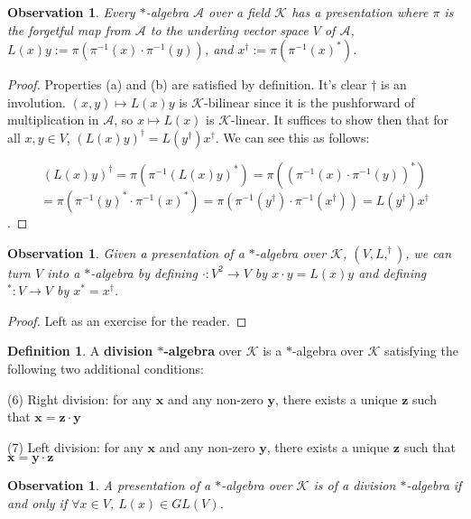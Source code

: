 \documentclass[12pt]{article}
\newtheorem{observation}[theorem]{Observation}
\theoremstyle{definition}
\newtheorem{definition}[theorem]{Definition}
\theoremstyle{remark}
\begin{document}
\begin{observation} Every \(*\)-algebra \(\mathcal{A}\) over a field \(\mathcal{K}\) has a presentation where \(\pi\) is the forgetful map from \(\mathcal{A}\) to the underling vector space \(V\) of \(\mathcal{A}\), \(L(x)y := \pi(\pi^{-1}(x) \cdot \pi^{-1}(y))\), and \(x^{\dagger} := \pi(\pi^{-1}(x)^*)\).
\end{observation}

\begin{proof}
Properties (a) and (b) are satisfied by definition. It's clear \(\dagger\) is an involution. \((x,y) \mapsto L(x)y\) is \(\mathcal{K}\)-bilinear since it is the pushforward of multiplication in \(\mathcal{A}\), so \(x \mapsto L(x)\) is \(\mathcal{K}\)-linear. It suffices to show then that for all \(x,y \in V\), $(L(x)y)^{\dagger} = L(y^{\dagger}) x^{\dagger}$. We can see this as follows:

\[(L(x)y)^{\dagger} = \pi(\pi^{-1}(L(x)y)^*) = \pi((\pi^{-1}(x) \cdot \pi^{-1}(y))^*)\] \[ = \pi(\pi^{-1}(y)^* \cdot \pi^{-1}(x)^*)= \pi(\pi^{-1}(y^{\dagger}) \cdot \pi^{-1}(x^{\dagger})) = L(y^{\dagger})x^{\dagger}\].
\end{proof}

\begin{observation} Given a presentation  of a \(*\)-algebra over \(\mathcal{K}\), \((V, L, ^{\dagger})\), we can turn \(V\) into a \(*\)-algebra by defining \(\cdot : V^2 \rightarrow V\) by \(x \cdot y = L(x)y\) and defining \(^* : V \rightarrow V\) by \(x^* = x^{\dagger}\).
\end{observation}

\begin{proof}
Left as an exercise for the reader.
\end{proof}

\begin{definition}
A \textbf{division $*$-algebra} over $\mathcal{K}$ is a $*$-algebra over $\mathcal{K}$ satisfying the following two additional conditions:

(6) Right division: for any $\mathbf{x}$ and any non-zero $\mathbf{y}$, there exists a unique $\mathbf{z}$ such that $\mathbf{x} = \mathbf{z} \cdot \mathbf{y}$

(7) Left division: for any $\mathbf{x}$ and any non-zero $\mathbf{y}$, there exists a unique $\mathbf{z}$ such that $\mathbf{x} = \mathbf{y} \cdot \mathbf{z}$
\end{definition}

\begin{observation}
A presentation of a \(*\)-algebra over \(\mathcal{K}\) is of a division \(*\)-algebra if and only if \(\forall x \in V\), \(L(x) \in GL(V)\). 
\end{observation}
\end{document}

